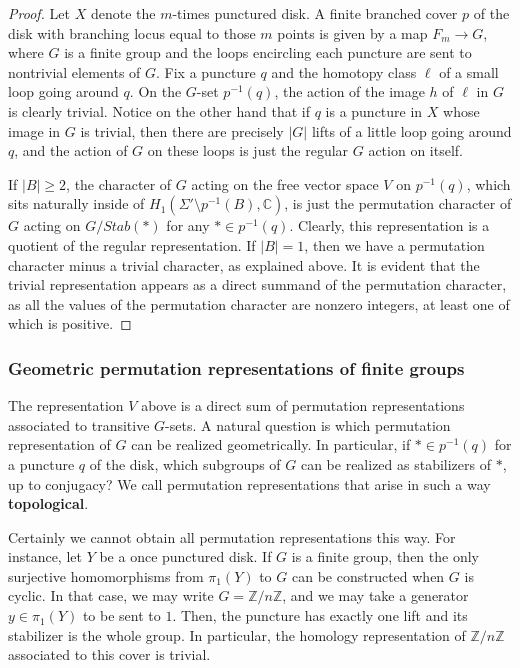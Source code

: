 \documentclass[11pt]{amsart}
\numberwithin{thm}{section}
\begin{document}
\begin{proof}
 Let $X$ denote the $m$-times punctured disk.  A finite branched cover $p$ of the disk with branching locus equal to those $m$ points is given by a map $F_m\to G$, where $G$ is a finite group and the loops encircling each puncture are sent to nontrivial elements of $G$.  Fix a puncture $q$ and the homotopy class $\ell$ of a small loop going around $q$.  On the $G$-set $p^{-1}(q)$, the action of the image $h$ of $\ell$ in $G$ is clearly trivial.  Notice on the other hand that if $q$ is a puncture in $X$ whose image in $G$ is trivial, then there are precisely $|G|$ lifts of a little loop going around $q$, and the action of $G$ on these loops is just the regular $G$ action on itself.

If $|B|\geq 2$, the character of $G$ acting on the free vector space $V$ on $p^{-1}(q)$, which sits naturally inside of $H_1(\Sigma'\setminus p^{-1}(B),{\mathbb{C}})$, is just the permutation character of $G$ acting on $G/Stab(*)$ for any $*\in p^{-1}(q)$.  Clearly, this representation is a quotient of the regular representation.  If $|B|=1$, then we have a permutation character minus a trivial character, as explained above.  It is evident that the trivial representation appears as a direct summand of the permutation character, as all the values of the permutation character are nonzero integers, at least one of which is positive. 
\end{proof}

\subsubsection{Geometric permutation representations of finite groups}
The representation $V$ above is a direct sum of permutation representations associated to transitive $G$-sets.  A natural question is which permutation representation of $G$ can be realized geometrically.  In particular, if $*\in p^{-1}(q)$ for a puncture $q$ of the disk, which subgroups of $G$ can be realized as stabilizers of $*$, up to conjugacy?  We call permutation representations that arise in such a way {\bf topological}.

Certainly we cannot obtain all permutation representations this way.  For instance, let $Y$ be a once punctured disk.  If $G$ is a finite group, then the only surjective homomorphisms from $\pi_1(Y)$ to $G$ can be constructed when $G$ is cyclic.  In that case, we may write $G={\mathbb{Z}}/n{\mathbb{Z}}$, and we may take a generator $y\in \pi_1(Y)$ to be sent to $1$.  Then, the puncture has exactly one lift and its stabilizer is the whole group.  In particular, the homology representation of ${\mathbb{Z}}/n{\mathbb{Z}}$ associated to this cover is trivial.
\end{document}

